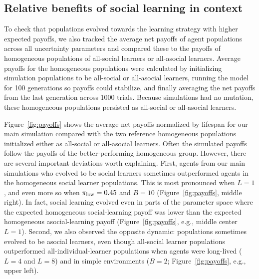 \documentclass[letterpaper,11.5pt]{scrartcl}
\begin{document}
\subsection{Relative benefits of social learning in context}

To check that populations evolved towards the learning strategy with higher expected payoffs, we also tracked the average net payoffs of agent populations across
all uncertainty parameters and compared these to the payoffs of homogeneous populations of all-social learners or all-asocial
learners. Average payoffs for the homogeneous populations were calculated by initializing simulation populations to be all-social or
all-asocial learners, running the model for 100 generations so payoffs could stabilize, and finally averaging the net payoffs from
the last generation across 1000 trials. Because simulations had no mutation, these homogeneous populations persisted as all-social
or all-asocial learners.

Figure~\ref{fig:payoffs} shows the average net payoffs normalized by lifespan
for our main simulation compared with the two reference homogeneous populations
initialized either as all-social or all-asocial learners. Often the simulated payoffs follow the payoffs of the better-performing homogeneous group. However, there are several important deviations worth explaining. First, agents from our main simulations who evolved to be social learners sometimes outperformed agents in the homogeneous social learner populations. This is most pronounced when $L=1$, and even more
so when $\pi_{\mathrm{low}}=0.45$ and $B=10$ (Figure~\ref{fig:payoffs}, middle right).
In fact, social learning evolved even in parts of the parameter space where the expected homogeneous social-learning payoff was lower than the expected homogeneous
asocial-learning payoff (Figure~\ref{fig:payoffs}, e.g., middle center $L=1$).
Second, we also observed the opposite dynamic: populations sometimes evolved to be asocial learners, even though all-social learner populations outperformed all-individual-learner populations when agents were long-lived ($L=4$ and $L=8$) and in simple environments ($B=2$; Figure~\ref{fig:payoffs}, e.g., upper left).
\end{document}
